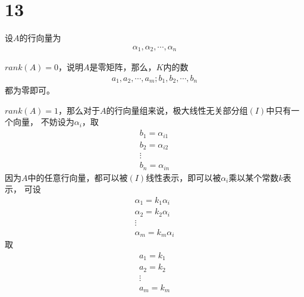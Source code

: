 \documentclass{article}
\begin{document}
\section*{13}

设$A$的行向量为
\begin{align*}
  \alpha_1, \alpha_2, \cdots, \alpha_n
\end{align*}

$rank(A) = 0$，说明$A$是零矩阵，那么，$K$内的数
\begin{align*}
  a_1, a_2, \cdots, a_m; b_1, b_2, \cdots, b_n
\end{align*}
都为零即可。

$rank(A) = 1$，那么对于$A$的行向量组来说，极大线性无关部分组$(I)$中只有一个向量，
不妨设为$\alpha_i$，取
\begin{align*}
  b_1 = \alpha_{i1} \\
  b_2 = \alpha_{i2} \\
  \vdots            \\
  b_n = \alpha_{in}
\end{align*}
因为$A$中的任意行向量，都可以被$(I)$线性表示，即可以被$\alpha_i$乘以某个常数$k$表示，
可设
\begin{align*}
  \alpha_1 = k_1 \alpha_i \\
  \alpha_2 = k_2 \alpha_i \\
  \vdots                  \\
  \alpha_m = k_m \alpha_i
\end{align*}
取
\begin{align*}
  a_1 = k_1 \\
  a_2 = k_2 \\
  \vdots \\
  a_m = k_m
\end{align*}
\end{document}
